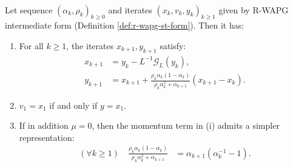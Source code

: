 \documentclass[12pt]{article}
\begin{document}
        \begin{proposition}\label{prop:r-wapg-momentum-repr}
            \;\\
            Let sequence $(\alpha_k, \rho_k)_{k \ge 0}$ and iterates $(x_k, v_k, y_k)_{k\ge 1}$ given by R-WAPG intermediate form (Definition \ref{def:r-wapg-st-form}).
            Then it has:
            \begin{enumerate}
                \item For all $k \ge 1$, the iterates $x_{k + 1}, y_{k + 1}$ satisfy:
                \begin{align*}
                    x_{k + 1} &= y_k - L^{-1}\mathcal G_L (y_k),
                    \\
                    y_{k + 1} &=
                    x_{k + 1} +
                    \frac{\rho_k\alpha_k(1 - \alpha_k)}
                    {\rho_k\alpha_k^2 + \alpha_{k + 1}}(x_{k + 1} - x_k).
                \end{align*}
                \item $v_1 = x_1$ if and only if $y = x_1$.
                \item If in addition $\mu = 0$, then the momentum term in (i) admits a simpler representation:
                \begin{align*}
                    (\forall k \ge 1) \quad
                    \frac{\rho_k\alpha_k(1 - \alpha_k)}{\rho_k\alpha_k^2 + \alpha_{k + 1}}
                    & = \alpha_{k + 1}(\alpha_k^{-1} - 1).
                \end{align*}
            \end{enumerate}
        \end{proposition}
\end{document}
